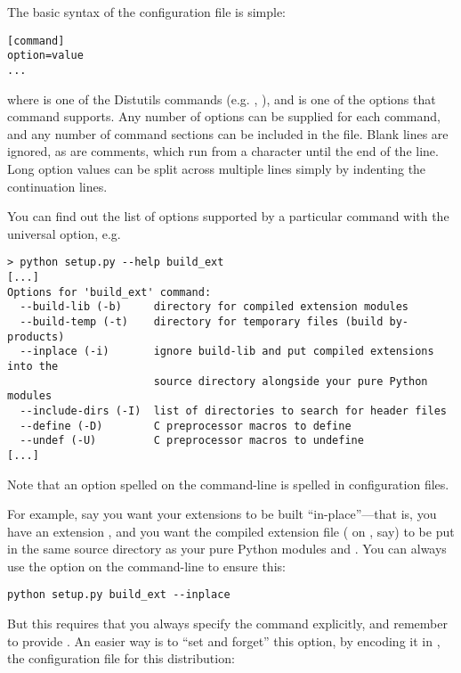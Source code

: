 \documentclass{howto}
\begin{document}
The basic syntax of the configuration file is simple:

\begin{verbatim}
[command]
option=value
...
\end{verbatim}

where  is one of the Distutils commands (e.g.
, ), and  is one of
the options that command supports.  Any number of options can be
supplied for each command, and any number of command sections can be
included in the file.  Blank lines are ignored, as are comments, which
run from a \character{\#} character until the end of the line.  Long
option values can be split across multiple lines simply by indenting
the continuation lines.

You can find out the list of options supported by a particular command
with the universal  option, e.g.

\begin{verbatim}
> python setup.py --help build_ext
[...]
Options for 'build_ext' command:
  --build-lib (-b)     directory for compiled extension modules
  --build-temp (-t)    directory for temporary files (build by-products)
  --inplace (-i)       ignore build-lib and put compiled extensions into the
                       source directory alongside your pure Python modules
  --include-dirs (-I)  list of directories to search for header files
  --define (-D)        C preprocessor macros to define
  --undef (-U)         C preprocessor macros to undefine
[...]
\end{verbatim}

Note that an option spelled  on the command-line 
is spelled  in configuration files.

For example, say you want your extensions to be built
``in-place''---that is, you have an extension , and you
want the compiled extension file ( on \UNIX, say) to be put
in the same source directory as your pure Python modules
 and .  You can always use the
 option on the command-line to ensure this:

\begin{verbatim}
python setup.py build_ext --inplace
\end{verbatim}

But this requires that you always specify the 
command explicitly, and remember to provide .
An easier way is to ``set and forget'' this option, by encoding it in
, the configuration file for this distribution:
\end{document}
